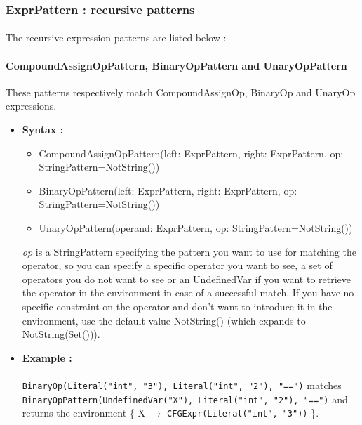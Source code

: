 \documentclass{report}
\begin{document}
\subsubsection{ExprPattern : recursive patterns}

\paragraph{}
\hspace{4mm}The recursive expression patterns are listed below :

\paragraph{CompoundAssignOpPattern, BinaryOpPattern and UnaryOpPattern}
These patterns respectively match CompoundAssignOp, BinaryOp and UnaryOp expressions.
\begin{itemize}	
    \item{\textbf{Syntax : }} 
	\begin{itemize}	
		\item CompoundAssignOpPattern(left: ExprPattern, right: ExprPattern, op: StringPattern=NotString())
		\item BinaryOpPattern(left: ExprPattern, right: ExprPattern, op: StringPattern=NotString())
		\item UnaryOpPattern(operand: ExprPattern, op: StringPattern=NotString())
	\end{itemize}
	\textit{op} is a StringPattern specifying the pattern you want to use for matching the operator, so you can specify a specific operator you want to see, a set of operators you do not want to see or an UndefinedVar if you want to retrieve
	the operator in the environment in case of a successful match. If you have no specific constraint on the operator and don't want to introduce it in the environment, use the default value NotString() (which expands to NotString(Set())).
    \item{\textbf{Example :}}  ~\\~\\
	\lstinline|BinaryOp(Literal("int", "3"), Literal("int", "2"), "==")| matches \lstinline|BinaryOpPattern(UndefinedVar("X"), Literal("int", "2"), "==")| and returns the environment \{ X $\rightarrow$ \lstinline|CFGExpr(Literal("int", "3"))| \}.
\end{itemize}
\end{document}
